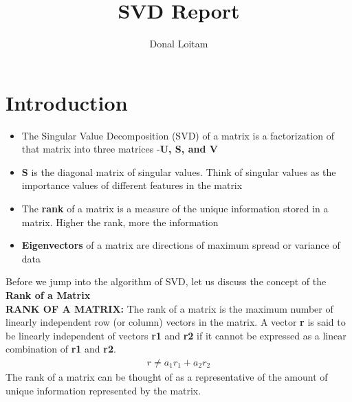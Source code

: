 \documentclass[a4paper, 11pt]{article}
\title{SVD Report}
\author{Donal Loitam}
\begin{document}
\maketitle
\tableofcontents

\section{Introduction}
\begin{itemize}
    \item The Singular Value Decomposition (SVD) of a matrix is a factorization of that matrix into three matrices -\textbf{U, S, and V} 
    \item \textbf{S} is the diagonal matrix of singular values. Think of singular values as the importance values of different features in the matrix
    \item The \textbf{rank} of a matrix is a measure of the unique information stored in a matrix. Higher the rank, more the information
    \item \textbf{Eigenvectors} of a matrix are directions of maximum spread or variance of data
\end{itemize}
Before we jump into the algorithm of SVD, let us discuss the concept of the \textbf{Rank of a Matrix}
\vspace{5mm}\\
\textbf{RANK OF A MATRIX: } The rank of a matrix is the maximum number of linearly independent row (or column) vectors in the matrix.  A vector \textbf{r} is said to be linearly independent of vectors 
\textbf{r1} and \textbf{r2} if it cannot be expressed as a linear combination of \textbf{r1} and \textbf{r2}.
\begin{align}
    r \neq a_1r_1 + a_2r_2
\end{align}
The rank of a matrix can be thought of as a representative of the amount of unique information represented by the matrix.

\pagebreak
\end{document}
